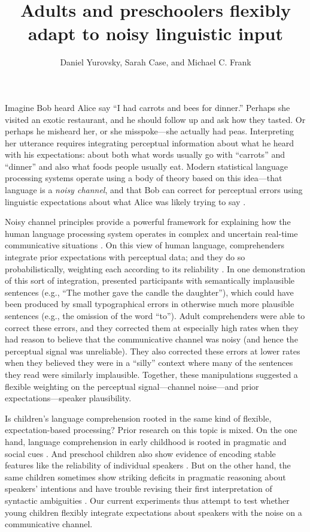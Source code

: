 \documentclass[man,floatsintext]{apa6}
\title{Adults and preschoolers flexibly adapt to noisy linguistic input}
\author{Daniel Yurovsky, Sarah Case, and Michael C. Frank}
\affiliation{Stanford University}
\begin{document}
\maketitle

Imagine Bob heard Alice say ``I had carrots and bees for dinner.'' Perhaps she visited an exotic restaurant, and he should follow up and ask how they tasted. Or perhaps he misheard her, or she misspoke---she actually had peas. Interpreting her utterance requires integrating perceptual information about what he heard with his expectations: about both what words usually go with ``carrots'' and ``dinner'' and also what foods people usually eat. Modern statistical language processing systems operate using a body of theory based on this idea---that language is a \emph{noisy channel}, and that Bob can correct for perceptual errors using linguistic expectations about what Alice was likely trying to say \cite{jelinek1976, shannon1948}. 

Noisy channel principles provide a powerful framework for explaining how the human language processing system operates in complex and uncertain real-time communicative situations \cite{clayards2008, levy2008, jaeger2010, kleinschmidt2015}. On this view of human language, comprehenders integrate prior expectations with perceptual data; and they do so probabilistically, weighting each according to its reliability \cite{ernst2002, jacobs1999}. In one demonstration of this sort of integration,  presented participants with semantically implausible sentences (e.g., ``The mother gave the candle the daughter''), which could have been produced by small typographical errors in otherwise much more plausible sentences (e.g., the omission of the word ``to''). Adult comprehenders were able to correct these errors, and they corrected them at especially high rates when they had reason to believe that the communicative channel was noisy (and hence the perceptual signal was unreliable). They also corrected these errors at lower rates when they believed they were in a ``silly'' context where many of the sentences they read were similarly implausible. Together, these manipulations suggested a flexible weighting on the perceptual signal---channel noise---and prior expectations---speaker plausibility. 

Is children's language comprehension rooted in the same kind of flexible, expectation-based processing? Prior research on this topic is mixed. On the one hand, language comprehension in early childhood is rooted in pragmatic and social cues \cite{clark2009,carpenter1998}. And preschool children also show evidence of encoding stable features like the reliability of individual speakers \cite{koenig2004, harris2012}. But on the other hand, the same children sometimes show striking deficits in pragmatic reasoning about speakers' intentions \cite{noveck2001} and have trouble revising their first interpretation of syntactic ambiguities \cite{trueswell1999}. Our current experiments thus attempt to test whether young children flexibly integrate expectations about speakers with the noise on a communicative channel. 
\end{document}
